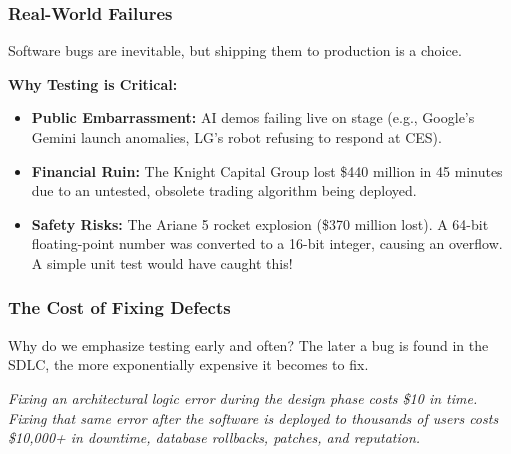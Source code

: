 \documentclass[xcolor=table]{beamer}
\begin{document}
\begin{frame}
    \frametitle{Real-World Failures}
    Software bugs are inevitable, but shipping them to production is a choice. 
    
    \vspace{0.3cm}
    \textbf{Why Testing is Critical:}
    \begin{itemize}
        \item \textbf{Public Embarrassment:} AI demos failing live on stage (e.g., Google's Gemini launch anomalies, LG's robot refusing to respond at CES).
        \item \textbf{Financial Ruin:} The Knight Capital Group lost \$440 million in 45 minutes due to an untested, obsolete trading algorithm being deployed.
        \item \textbf{Safety Risks:} The Ariane 5 rocket explosion (\$370 million lost). A 64-bit floating-point number was converted to a 16-bit integer, causing an overflow. A simple unit test would have caught this!
    \end{itemize}
\end{frame}

\begin{frame}
    \frametitle{The Cost of Fixing Defects}
    Why do we emphasize testing early and often? The later a bug is found in the SDLC, the more exponentially expensive it becomes to fix.
    
    \vspace{0.3cm}
    \centering
    
    \vspace{0.2cm}
    \scriptsize \textit{Fixing an architectural logic error during the design phase costs \$10 in time. Fixing that same error after the software is deployed to thousands of users costs \$10,000+ in downtime, database rollbacks, patches, and reputation.}
\end{frame}
\end{document}
